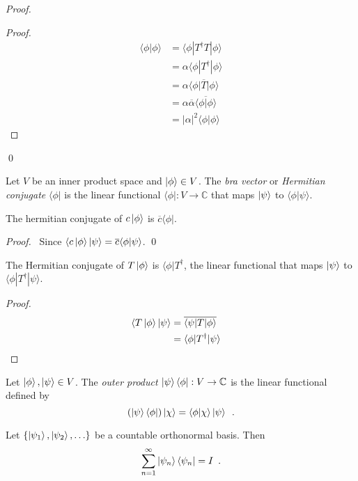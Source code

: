 \begin{proof}
\pf
{}
\begin{proof}
	\pf
	\begin{align*}
		\langle \phi | \phi \rangle
		& = \langle \phi | T^\dagger T | \phi \rangle \\
		& = \alpha \langle \phi | T^\dagger | \phi \rangle \\
		& = \alpha \overline{\langle \phi | T | \phi \rangle} \\
		& = \alpha \overline{\alpha} \overline{\langle \phi | \phi \rangle} \\
		& = |\alpha|^2 \langle \phi | \phi \rangle
	\end{align*}
\end{proof}
\qed
\end{proof}

\begin{df}
Let $V$ be an inner product space and $\left| {\phi} \right\rangle \in V$. The \emph{bra vector} or \emph{Hermitian conjugate} $\langle \phi |$ is the linear functional $\langle \phi | : V \rightarrow \mathbb{C}$ that maps $\left| {\psi} \right\rangle$ to $\langle \phi | \psi \rangle$.
\end{df}

\begin{prop}
The hermitian conjugate of $c \left| {\phi} \right\rangle$ is $\overline{c} \langle \phi |$.
\end{prop}

\begin{proof}
\pf\ Since $\langle c \left| {\phi} \right\rangle | \psi \rangle = \overline{c} \langle \phi | \psi \rangle$. \qed
\end{proof}

\begin{prop}
The Hermitian conjugate of $T \left| {\phi} \right\rangle$ is $\langle \phi | T^\dagger$, the linear functional that maps $\left| {\psi} \right\rangle$ to $\langle \phi | T^\dagger | \psi \rangle$.
\end{prop}

\begin{proof}
\pf
\begin{align*}
\langle T \left| {\phi} \right\rangle | \psi \rangle & = \overline{\langle \psi | T | \phi \rangle} \\
& = \langle \phi | T^\dagger | \psi \rangle & \relax
\end{align*}
\end{proof}

\begin{df}
Let $\left| {\phi} \right\rangle, \left| {\psi} \right\rangle \in V$. The \emph{outer product} $\left| {\psi} \right\rangle \langle \phi | : V \rightarrow \mathbb{C}$ is the linear functional defined by
\[ (\left| {\psi} \right\rangle \langle \phi |) \left| {\chi} \right\rangle = \langle \phi | \chi \rangle \left| {\psi} \right\rangle \enspace . \]
\end{df}

\begin{prop}
Let $\{ \left| {\psi_1} \right\rangle, \left| {\psi_2} \right\rangle, \ldots \}$ be a countable orthonormal basis. Then
\[ \sum_{n=1}^\infty \left| {\psi_n} \right\rangle \langle \psi_n | = I \enspace . \]
\end{prop}